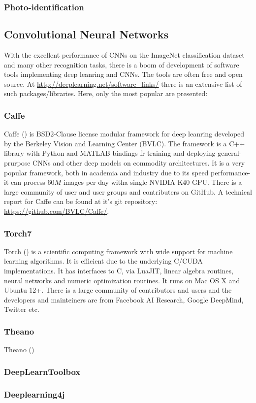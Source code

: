 \subsubsection{Photo-identification}


\subsection{Convolutional Neural Networks}
With the excellent performance of CNNs on the ImageNet classification dataset and many other recognition tasks, there is a boom of development of software tools implementing deep leanring and CNNs. 
The tools are often free and open source. At \url{http://deeplearning.net/software_links/} there is an extensive list of such packages/libraries. Here, only the most popular are presented:
\subsubsection{Caffe}
Caffe (\cite{caffe_soft}) is BSD2-Clause license modular framework for deep leanring developed by the Berkeley Vision and Learning Center (BVLC). The framework is a C++ library with Python and MATLAB bindings fr training and deploying general-prurpose CNNs and other deep models on commodity architectures. It is a very popular framework, both in academia and industry due to its speed performance- it can process $60M$ images per day witha single NVIDIA K40 GPU. There is a large community of user and user groups and contributers on GitHub. A technical report for Caffe can be found at it's git repository: \url{https://github.com/BVLC/Caffe/}.
\subsubsection{Torch7}
Torch (\cite{torch_soft}) is a scientific computing framework with wide support for machine learning algorithms. It is efficient due to the underlying C/CUDA implementations. It has interfaces to C, via LuaJIT, linear algebra routines, neural networks and numeric optimization routines. It runs on Mac OS X and Ubuntu 12+. There is a large community of contributors and users and the developers and mainteiners are from Facebook AI Research, Google DeepMind, Twitter etc. 
\subsubsection{Theano}
Theano (\cite{theano_soft})
\subsubsection{DeepLearnToolbox}
\subsubsection{Deeplearning4j}
